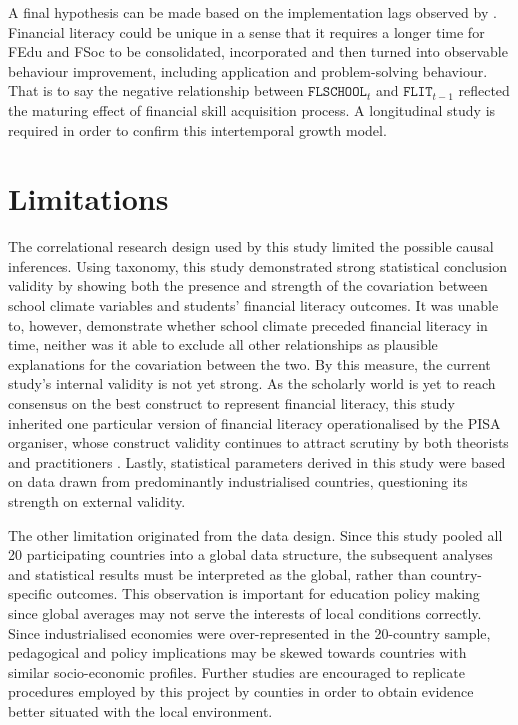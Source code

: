 A final hypothesis can be made based on the implementation lags observed by \textcite{bernheim:2001}. Financial literacy could be unique in a sense that it requires a longer time for FEdu and FSoc to be consolidated, incorporated and then turned into observable behaviour improvement, including application and problem-solving behaviour. That is to say the negative relationship between $\texttt{FLSCHOOL}_t$ and $\texttt{FLIT}_{t-1}$ reflected the maturing effect of financial skill acquisition process. A longitudinal study is required in order to confirm this intertemporal growth model.

\section{Limitations}

The correlational research design used by this study limited the possible causal inferences. Using  taxonomy, this study demonstrated strong statistical conclusion validity by showing both the presence and strength of the covariation between school climate variables and students' financial literacy outcomes. It was unable to, however, demonstrate whether school climate preceded financial literacy in time, neither was it able to exclude all other relationships as plausible explanations for the covariation between the two. By this measure, the current study's internal validity is not yet strong. As the scholarly world is yet to reach consensus on the best construct to represent financial literacy, this study inherited one particular version of financial literacy operationalised by the PISA organiser, whose construct validity continues to attract scrutiny by both theorists and practitioners \parencite{schuhen:2014}. Lastly, statistical parameters derived in this study were based on data drawn from predominantly industrialised countries, questioning its strength on external validity.

The other limitation originated from the data design. Since this study pooled all 20 participating countries into a global data structure, the subsequent analyses and statistical results must be interpreted as the global, rather than country-specific outcomes. This observation is important for education policy making since global averages may not serve the interests of local conditions correctly. Since industrialised economies were over-represented in the 20-country sample, pedagogical and policy implications may be skewed towards countries with similar socio-economic profiles. Further studies are encouraged to replicate procedures employed by this project by counties in order to obtain evidence better situated with the local environment.

